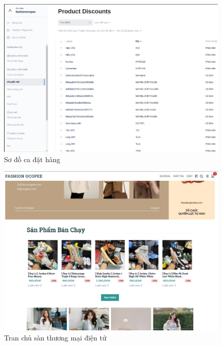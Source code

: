 \begin{figure}[h!]
	\begin{center}	
		\includegraphics[width=\textwidth]{./results/discount}
		\caption{Sơ đồ ca đặt hàng}
	\end{center}
\end{figure}


\begin{figure}[h!]
	\begin{center}	
		\includegraphics[width=\textwidth]{./results/homepage}
		\caption{Tran chủ sàn thương mại điện tử}
	\end{center}
\end{figure}

